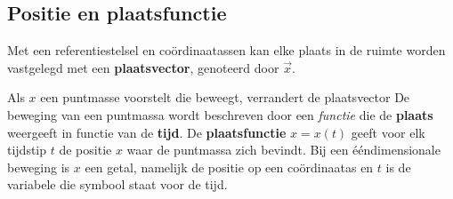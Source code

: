 \documentclass{ximera}
\begin{document}
	\author{Bart Lambregs}
    \xmsource\xmuitleg







\subsection*{Positie en plaatsfunctie}

Met een referentiestelsel en coördinaatassen kan elke plaats in de ruimte worden vastgelegd met een \textbf{plaatsvector}, genoteerd door \(\vec{x}\).  

\begin{image}
\end{image}
  

Als \(x\) een puntmasse voorstelt die beweegt, verrandert de plaatsvector   
De beweging van een puntmassa wordt beschreven door een \textit{functie} die de \textbf{plaats} weergeeft in functie van de \textbf{tijd}. 
De \textbf{plaatsfunctie} $x = x(t)$ geeft voor elk tijdstip \(t\) de positie \(x\) waar de puntmassa zich bevindt. 
Bij een ééndimensionale beweging is $x$ een getal, namelijk de positie op een coördinaatas
en $t$ is de variabele die symbool staat voor de tijd.
\end{document}
